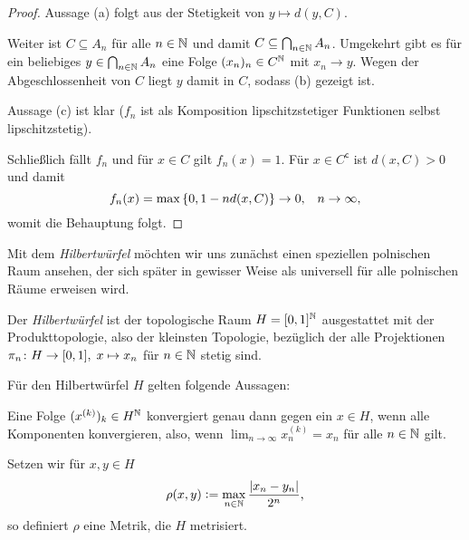 \documentclass[../main/main.tex]{subfiles}
\begin{document}
	\begin{proof}
		Aussage (a) folgt aus der Stetigkeit von $y \mapsto d(y, C)$.
		
		Weiter ist $C \subseteq A_n$ für alle $n \in \mathbb{N}$ und damit 
		$C \subseteq \bigcap_{n \in \mathbb{N}} A_n$. 
		Umgekehrt gibt es für ein beliebiges $y \in \bigcap_{n \in \mathbb{N}} A_n$
		eine Folge $(x_n)_n \in C^{\mathbb{N}}$ mit $x_n \rightarrow y$. 
		Wegen der Abgeschlossenheit von $C$ liegt $y$ damit in $C$, sodass (b) gezeigt ist.
		
		Aussage (c) ist klar ($f_n$ ist als Komposition 
		lipschitzstetiger Funktionen selbst lipschitzstetig).
		
		Schließlich fällt $f_n$ und für $x \in C$ gilt $f_n(x) = 1$. 
		Für $x \in C^\mathsf{c}$ ist $d(x, C) > 0$ und damit
		$$f_n(x) = \max \left\{0, 1-n d(x, C)\right\} 
		\to 0 \text{,} \quad n \to \infty \text{,}$$
		womit die Behauptung folgt.
	\end{proof}

	Mit dem \emph{Hilbertwürfel} möchten wir uns zunächst einen speziellen polnischen Raum ansehen, 
	der sich später in gewisser Weise als universell für alle polnischen Räume erweisen wird.

	\begin{Definition}[Hilbertwürfel]
		Der \emph{Hilbertwürfel} ist der topologische Raum $H = [0, 1]^{\mathbb{N}}$ 
		ausgestattet mit der Produkttopologie, also der kleinsten Topologie, 
		bezüglich der alle Projektionen $\pi_n \colon H \to [0, 1], \; x \mapsto x_n $ 
		für $n \in \mathbb{N}$ stetig sind.
	\end{Definition}
	
	\begin{Hilfssatz}
		\label{lem:hilbertcube}
		Für den Hilbertwürfel $H$ gelten folgende Aussagen:
		\begin{enumeratethm}
			\item Eine Folge $(x^{(k)})_k \in H^{\mathbb{N}}$ konvergiert genau dann gegen 
			ein $x \in H$, wenn alle Komponenten konvergieren, also, wenn
			$\lim_{n \to \infty} x_n^{(k)} = x_n$ für alle $n \in \mathbb{N}$ gilt.
			\item Setzen wir für $x, y \in H$
			$$\rho(x, y) \vcentcolon = \max_{n \in \mathbb{N}} \frac{|x_n - y_n|}{2^n} \text{,}$$
			so definiert $\rho$ eine Metrik, die $H$ metrisiert.
		\end{enumeratethm}
	\end{Hilfssatz}
	
\end{document}
